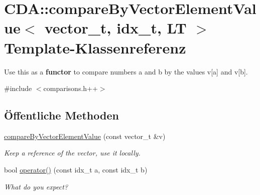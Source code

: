 \hypertarget{structCDA_1_1compareByVectorElementValue}{
\section{CDA::compareByVectorElementValue$<$ vector\_\-t, idx\_\-t, LT $>$ Template-\/Klassenreferenz}
\label{structCDA_1_1compareByVectorElementValue}
}


Use this as a {\bfseries functor} to compare numbers a and b by the values v\mbox{[}a\mbox{]} and v\mbox{[}b\mbox{]}.  




{\ttfamily \#include $<$comparisons.h++$>$}

\subsection*{Öffentliche Methoden}
\begin{DoxyCompactItemize}
\item 
\hypertarget{structCDA_1_1compareByVectorElementValue_a9fa53a4855d6f8aeae5e14f63a53bdc2}{
\hyperlink{structCDA_1_1compareByVectorElementValue_a9fa53a4855d6f8aeae5e14f63a53bdc2}{compareByVectorElementValue} (const vector\_\-t \&v)}
\label{structCDA_1_1compareByVectorElementValue_a9fa53a4855d6f8aeae5e14f63a53bdc2}

\begin{DoxyCompactList}\small\item\em Keep a reference of the vector, use it locally. \item\end{DoxyCompactList}\item 
\hypertarget{structCDA_1_1compareByVectorElementValue_a80b11bd2729685221e5ed63b664d36b3}{
bool \hyperlink{structCDA_1_1compareByVectorElementValue_a80b11bd2729685221e5ed63b664d36b3}{operator()} (const idx\_\-t a, const idx\_\-t b)}
\label{structCDA_1_1compareByVectorElementValue_a80b11bd2729685221e5ed63b664d36b3}

\begin{DoxyCompactList}\small\item\em What do you expect? \item\end{DoxyCompactList}\end{DoxyCompactItemize}
